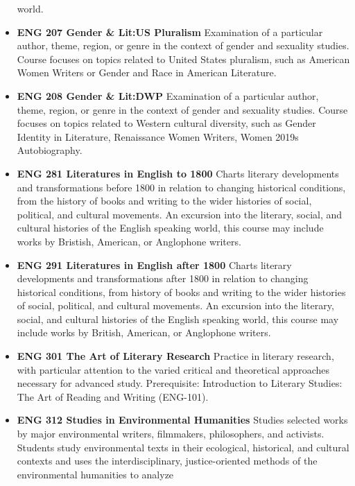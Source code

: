 \documentclass[
  letterpaper,
]{scrbook}
\begin{document}
\begin{itemize}
  world.\\
\item
  \textbf{ENG 207 Gender \& Lit:US Pluralism} Examination of a
  particular author, theme, region, or genre in the context of gender
  and sexuality studies. Course focuses on topics related to United
  States pluralism, such as American Women Writers or Gender and Race in
  American Literature.\\
\item
  \textbf{ENG 208 Gender \& Lit:DWP} Examination of a particular author,
  theme, region, or genre in the context of gender and sexuality
  studies. Course focuses on topics related to Western cultural
  diversity, such as Gender Identity in Literature, Renaissance Women
  Writers, Women 2019s Autobiography.\\
\item
  \textbf{ENG 281 Literatures in English to 1800} Charts literary
  developments and transformations before 1800 in relation to changing
  historical conditions, from the history of books and writing to the
  wider histories of social, political, and cultural movements. An
  excursion into the literary, social, and cultural histories of the
  English speaking world, this course may include works by Bristish,
  American, or Anglophone writers.\\
\item
  \textbf{ENG 291 Literatures in English after 1800} Charts literary
  developments and transformations after 1800 in relation to changing
  historical conditions, from history of books and writing to the wider
  histories of social, political, and cultural movements. An excursion
  into the literary, social, and cultural histories of the English
  speaking world, this course may include works by British, American, or
  Anglophone writers.\\
\item
  \textbf{ENG 301 The Art of Literary Research} Practice in literary
  research, with particular attention to the varied critical and
  theoretical approaches necessary for advanced study. Prerequisite:
  Introduction to Literary Studies: The Art of Reading and Writing
  (ENG-101).\\
\item
  \textbf{ENG 312 Studies in Environmental Humanities} Studies selected
  works by major environmental writers, filmmakers, philosophers, and
  activists. Students study environmental texts in their ecological,
  historical, and cultural contexts and uses the interdisciplinary,
  justice-oriented methods of the environmental humanities to analyze

\end{itemize}
\end{document}
